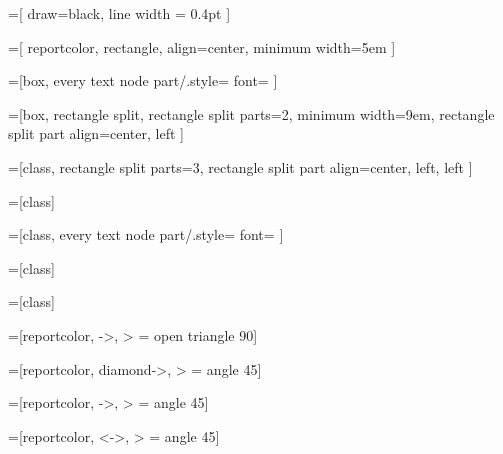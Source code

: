 \usepackage{tikz}
\usetikzlibrary{arrows}
\usetikzlibrary{shapes}
\usetikzlibrary{patterns}
\usetikzlibrary{positioning}
\usetikzlibrary{calc}
\usetikzlibrary{trees}

\newcommand*{\stereotype}[1]{
  <<{#1}>>
}

\newcommand*{\datatype}[1]{
  \stereotype{datatype}\\
  #1
}

\newcommand*{\enum}[1]{
  \stereotype{enumeration}\\
  #1
}

\newcommand*{\obj}[2]{
  \underline{{#1}~:~{#2}}
}

\newcommand*{\attributes}[1]{
  \nodepart{second}
  \begin{tabular}{@{}l@{}}
  #1
  \end{tabular}
}

\newcommand*{\literals}[1]{
  \nodepart{second}
  \ttfamily
  \begin{tabular}{@{}l@{}}
  #1
  \end{tabular}
}

\newcommand*{\operations}[1]{
  \nodepart{third}
  \begin{tabular}{@{}l@{}}
  #1
  \end{tabular}
}

=[
  draw=black,
  line width = 0.4pt
]

=[
  reportcolor,
  rectangle,
  align=center,
  minimum width=5em
]

=[box,
  every text node part/.style={
    font=\itshape
  }
]

=[box,
  rectangle split,
  rectangle split parts=2,
  minimum width=9em,
  rectangle split part align={center, left}
]

=[class,
  rectangle split parts=3,
  rectangle split part align={center, left, left}
]
  
=[class]

=[class,
  every text node part/.style={
    font=\itshape
  }
]

=[class]

=[class]

=[reportcolor, ->, > = open triangle 90]

=[reportcolor, diamond->, > = angle 45]

=[reportcolor, ->, > = angle 45]

=[reportcolor, <->, > = angle 45]


